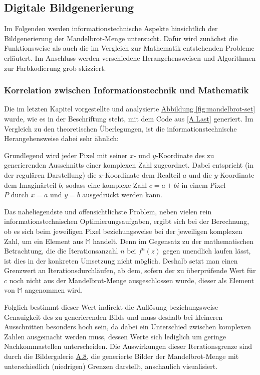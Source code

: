 \subsection{Digitale Bildgenerierung}\label{subsec:digital-generation}

Im Folgenden werden informationstechnische Aspekte hinsichtlich der Bildgenerierung
der Mandelbrot-Menge untersucht.
Dafür wird zunächst die Funktionsweise als auch die im Vergleich zur Mathematik
entstehenden Probleme erläutert.
Im Anschluss werden verschiedene Herangehensweisen und Algorithmen zur Farbkodierung
grob skizziert.

\subsubsection{Korrelation zwischen Informationstechnik und Mathematik}
\label{subsubsec:correlation-between-it-and-mathematics}

Die im letzten Kapitel vorgestellte und analysierte \hyperref[fig:mandelbrot-set]
{Abbildung \ref{fig:mandelbrot-set}} wurde,
wie es in der Beschriftung steht, mit dem Code aus \hyperref[app:last]{[A.Last]}
generiert.
Im Vergleich zu den theoretischen Überlegungen, ist die
informationstechnische Herangehensweise dabei sehr ähnlich:

Grundlegend wird jeder Pixel mit seiner $x$- und $y$-Koordinate des zu generierenden
Ausschnitts einer komplexen Zahl zugeordnet.
Dabei entspricht (in der regulären Darstellung) die $x$-Koordinate dem Realteil
$a$ und die $y$-Koordinate dem Imagin\"arteil $b$, sodass eine komplexe Zahl
$c = a + bi$ in einem Pixel $P \text{ durch } x = a \text{ und } y = b$ ausgedrückt
werden kann.

Das naheliegendste und offensichtlichste Problem,
neben vielen rein informationstechnischen Optimierungsaufgaben,
ergibt sich bei der Berechnung, ob es sich beim jeweiligen Pixel
beziehungsweise bei der jeweiligen komplexen Zahl, um ein Element aus
$\mathbb{M}$ handelt.
Denn im Gegensatz zu der mathematischen Betrachtung, die die Iterationsanzahl
$n$ bei $f^n(z)$ gegen unendlich laufen lässt, ist dies in der konkreten Umsetzung
nicht möglich.
Deshalb setzt man einen Grenzwert an Iterationsdurchläufen, ab dem, sofern der zu
überprüfende Wert für $c$ noch nicht aus der Mandelbrot-Menge ausgeschlossen wurde,
dieser als Element von $\mathbb{M}$ angenommen wird.

Folglich bestimmt dieser Wert indirekt die Auflösung beziehungsweise Genauigkeit
des zu generierenden Bilds und muss deshalb bei kleineren Ausschnitten besonders
hoch sein, da dabei ein Unterschied zwischen komplexen Zahlen ausgemacht werden
muss, dessen Werte sich lediglich um geringe Nachkommastellen unterscheiden.
Die Auswirkungen dieser Iterationsgrenze sind durch die Bildergalerie
\hyperref[app:8]{A.8}, die generierte Bilder der Mandelbrot-Menge
mit unterschiedlich (niedrigen) Grenzen darstellt, anschaulich visualisiert.


